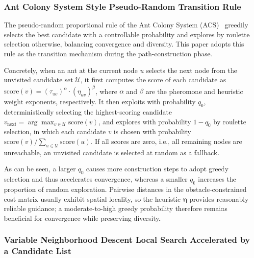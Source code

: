 \documentclass[pdflatex,sn-basic,Numbered]{sn-jnl}
\begin{document}
\subsubsection{Ant Colony System Style Pseudo-Random Transition Rule}

The pseudo-random proportional rule of the Ant Colony System (ACS)~\cite{ref22} greedily selects the best candidate with a controllable probability and explores by roulette selection otherwise, balancing convergence and diversity. This paper adopts this rule as the transition mechanism during the path-construction phase.

Concretely, when an ant at the current node $u$ selects the next node from the unvisited candidate set $\mathcal{U}$, it first computes the score of each candidate as $\mathrm{score}(v) = (\tau_{uv})^{\alpha} \cdot (\eta_{uv})^{\beta}$, where $\alpha$ and $\beta$ are the pheromone and heuristic weight exponents, respectively. It then exploits with probability $q_0$, deterministically selecting the highest-scoring candidate $v_{\mathrm{next}} = \arg\max_{v \in \mathcal{U}} \mathrm{score}(v)$, and explores with probability $1 - q_0$ by roulette selection, in which each candidate $v$ is chosen with probability $\mathrm{score}(v) / \sum_{u \in \mathcal{U}} \mathrm{score}(u)$. If all scores are zero, i.e., all remaining nodes are unreachable, an unvisited candidate is selected at random as a fallback.

As can be seen, a larger $q_0$ causes more construction steps to adopt greedy selection and thus accelerates convergence, whereas a smaller $q_0$ increases the proportion of random exploration. Pairwise distances in the obstacle-constrained cost matrix usually exhibit spatial locality, so the heuristic $\bm{\eta}$ provides reasonably reliable guidance; a moderate-to-high greedy probability therefore remains beneficial for convergence while preserving diversity.

\subsubsection{Variable Neighborhood Descent Local Search Accelerated by a Candidate List}
\label{subsec:vnd}
\end{document}
